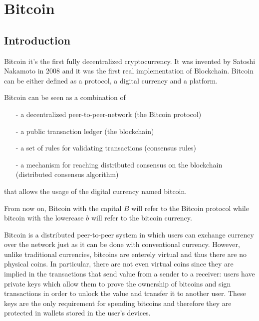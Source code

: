 \section{Bitcoin}\label{sec:Bitcoin}
\subsection{Introduction}

Bitcoin it's the first fully decentralized cryptocurrency. It was invented by
Satoshi Nakamoto in 2008 and it was the first real implementation of Blockchain.
Bitcoin can be either defined as a protocol, a digital currency and a platform.

Bitcoin can be seen as a combination of
\vspace{-\topsep}
\begin{itemize}
  \item[-] a decentralized peer-to-peer-network (the Bitcoin protocol)
  \item[-] a public transaction ledger (the blockchain)
  \item[-] a set of rules for validating transactions (consensus rules)
  \item[-] a mechanism for reaching distributed consensus on the blockchain (distributed
  consensus algorithm)
\end{itemize}
\vspace{-\topsep}
that allows the usage of the digital currency named bitcoin.

From now on, Bitcoin with the capital $B$ will refer to the Bitcoin protocol
while bitcoin with the lowercase $b$ will refer to the bitcoin currency.



Bitcoin is a distributed peer-to-peer system in which users can exchange
currency over the network just as it can be done with conventional currency.
However, unlike traditional currencies, bitcoins are enterely virtual and thus
there are no physical coins. In particular, there are not even virtual coins since
they are implied in the transactions that send value from a sender to a receiver:
users have private keys which allow them to prove the ownership of bitcoins and
sign transactions in order to unlock the value and transfer it to another user.
These keys are the only requirement for spending bitcoins and therefore they are
protected in wallets stored in the user's devices.

